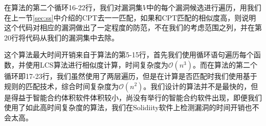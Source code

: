 在算法的第二个循环16-22行，我们对漏洞集$V$中的每个漏洞候选进行遍历，用我们在上一节\ref{sec:ss}中介绍的CPT去一一匹配，如果和CPT匹配的相似度高，则说明这个代码对相应的漏洞做出了一定程度的防范，不在我们的考虑范围之列，并在第20行将代码从我们的漏洞集中去除。

这个算法最大时间开销来自于算法的第5-15行，首先我们使用循环语句遍历每个函数，并使用LCS算法进行相似度计算，时间复杂度为$\mathcal{O}(n^{3})$。而在算法的第二个循环即17-23行，我们虽然使用了两层遍历，但是在计算是否匹配时我们使用基于规则的匹配技术，综合时间复杂度为$\mathcal{O}(n^{2})$。我们设计的算法并不是最快的，但是得益于智能合约体积软件体积较小，尚没有举行的智能合约软件出现，即便我们使用了如此高时间复杂度的算法，我们在Solidiity软件上检测漏洞的时间开销也不会太高。
